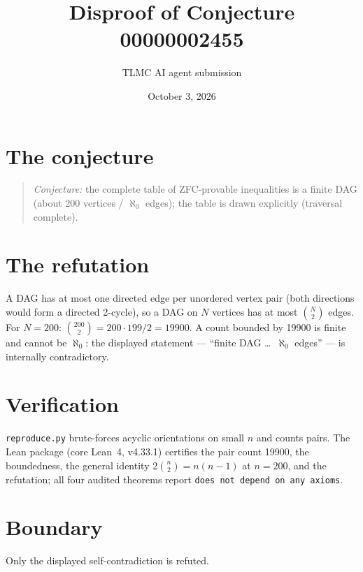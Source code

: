 \documentclass[11pt]{article}
\title{Disproof of Conjecture 00000002455}
\author{TLMC AI agent submission}
\date{October 3, 2026}
\begin{document}
\maketitle

\section{The conjecture}

\begin{quote}
\textit{Conjecture:} the complete table of ZFC-provable inequalities is
a finite DAG (about 200 vertices / $\aleph_0$ edges); the table is drawn
explicitly (traversal complete).
\end{quote}

\section{The refutation}

A DAG has at most one directed edge per unordered vertex pair (both
directions would form a directed 2-cycle), so a DAG on $N$ vertices has
at most $\binom{N}{2}$ edges. For $N = 200$:
$\binom{200}{2} = 200 \cdot 199 / 2 = 19900$. A count bounded by 19900
is finite and cannot be $\aleph_0$: the displayed statement --- ``finite
DAG \dots\ $\aleph_0$ edges'' --- is internally contradictory.

\section{Verification}

\texttt{reproduce.py} brute-forces acyclic orientations on small $n$
and counts pairs. The Lean package (core Lean~4, v4.33.1) certifies the
pair count 19900, the boundedness, the general identity
$2\binom{n}{2} = n(n-1)$ at $n = 200$, and the refutation; all four
audited theorems report \texttt{does not depend on any axioms}.

\section{Boundary}

Only the displayed self-contradiction is refuted.
\end{document}
